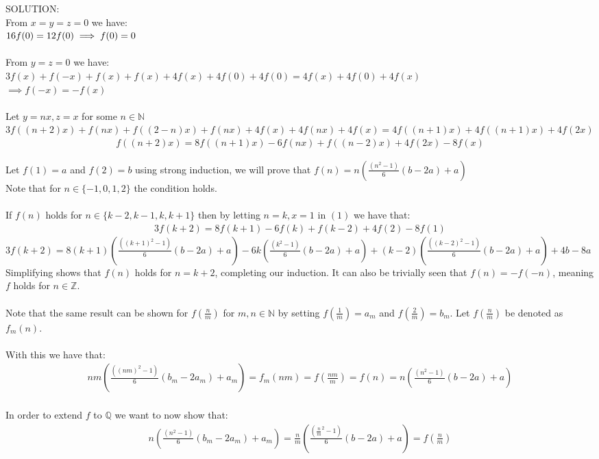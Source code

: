 \documentclass{article}
\begin{document}
\begin{enumerate}[1.]
SOLUTION:\\

From $x=y=z=0$ we have:
\\$16f(0) = 12f(0) \\\implies f(0) = 0$
\\\\From $y=z=0$ we have:
\\$3f(x) + f(-x) + f(x) + f(x) + 4f(x) + 4f(0) + 4f(0) = 4f(x) + 4f(0) + 4f(x)$
\\$\implies f(-x) = -f(x)$
\\\\Let $y=nx, z=x$ for some $n \in \mathbb{N}$
\\$3f((n+2)x) + f(nx) + f((2-n)x) + f(nx) + 4f(x) + 4f(nx) + 4f(x) = 4f((n+1)x) + 4f((n+1)x) + 4f(2x)$
\begin{align}
f((n+2)x) = 8f((n+1)x) -6f(nx) + f((n-2)x) +4f(2x) - 8f(x)
\end{align}

Let $f(1) = a$ and $f(2) = b$ using strong induction, we will prove that $f(n) = n(\frac{(n^2-1)}{6}(b-2a)+a)$ 
\\Note that for $n\in \{-1,0,1,2\}$ the condition holds.
\\\\If $f(n)$ holds for $n\in\{k-2,k-1,k,k+1\}$ then by letting $n=k, x=1$ in $(1)$ we have that:
\begin{align}
3f(k+2) = 8f(k+1) -6f(k) + f(k-2) +4f(2) - 8f(1)\nonumber
\end{align}
$3f(k+2) = 8(k+1)(\frac{((k+1)^2-1)}{6}(b-2a)+a) - 6k(\frac{(k^2-1)}{6}(b-2a)+a) + (k-2)(\frac{((k-2)^2-1)}{6}(b-2a)+a) + 4b - 8a$\\

Simplifying shows that $f(n)$ holds for $n = k+2$, completing our induction. It can also be trivially seen that $f(n) = -f(-n)$, meaning $f$ holds for $n\in\mathbb{Z}$.
\\\\Note that the same result can be shown for $f(\frac{n}{m})$ for $m,n\in\mathbb{N} $ by setting $f(\frac{1}{m}) = a_m$ and  $f(\frac{2}{m}) = b_m$. Let $f(\frac{n}{m})$ be denoted as $f_m(n)$.
\\\\With this we have that:
\begin{align}
nm(\frac{((nm)^2-1)}{6}(b_m-2a_m)+a_m) = f_m(nm) = f(\frac{nm}{m}) = f(n) = n(\frac{(n^2-1)}{6}(b-2a)+a)
\end{align}
\\In order to extend $f$ to $\mathbb{Q}$ we want to now show that:
\begin{align}
n(\frac{(n^2-1)}{6}(b_m-2a_m)+a_m) = \frac{n}{m}(\frac{(\frac{n}{m}^2-1)}{6}(b-2a)+a) = f(\frac{n}{m})
\end{align}


\end{enumerate}
\end{document}
